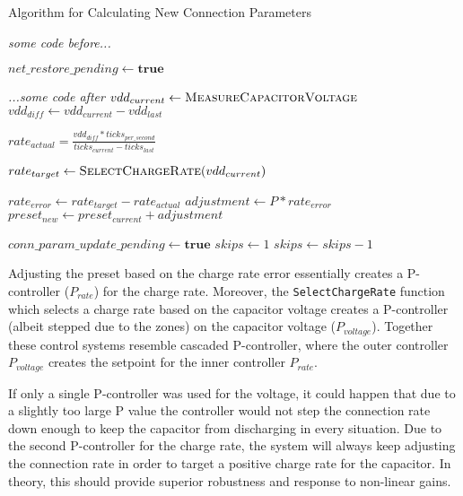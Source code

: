 \begin{algorithm}
    \caption{Algorithm for Calculating New Connection Parameters}
    \label{alg:conn_params_control_system}
    \begin{algorithmic}[1] 
            \State \textit{some code before...}

                \State {}
            \Else
                    \State $net\_restore\_pending \gets \textbf{true}$
                \Else
                    \State {}
                \EndIf
            \EndIf

            \State \textit{...some code after}
        \EndProcedure
            \State $vdd_{current} \gets \Call{MeasureCapacitorVoltage}{}$
            \State $vdd_{diff} \gets vdd_{current} - vdd_{last}$

                    \State $rate_{actual} = \frac{vdd_{diff} * ticks_{per\_second}}{ticks_{current} - ticks_{last}}$

                    \State $rate_{target} \gets \Call{SelectChargeRate}{vdd_{current}}$

                    \State $rate_{error} \gets rate_{target} - rate_{actual}$ 
                    \State $adjustment \gets P * rate_{error}$
                    \State $preset_{new} \gets preset_{current} + adjustment$

                        \State $conn\_param\_update\_pending \gets \textbf{true}$
                        \State $skips \gets 1$
                    \EndIf
                \Else
                    \State $skips \gets skips - 1$
                \EndIf
            \EndIf
        \EndProcedure
    \end{algorithmic}
\end{algorithm}

Adjusting the preset based on the charge rate error essentially creates a P-controller ($P_{rate}$) for the charge rate. Moreover, the \texttt{SelectChargeRate} function which selects a charge rate based on the capacitor voltage creates a P-controller (albeit stepped due to the zones) on the capacitor voltage ($P_{voltage}$). Together these control systems resemble cascaded P-controller, where the outer controller $P_{voltage}$ creates the setpoint for the inner controller $P_{rate}$. 

If only a single P-controller was used for the voltage, it could happen that due to a slightly too large P value the controller would not step the connection rate down enough to keep the capacitor from discharging in every situation. Due to the second P-controller for the charge rate, the system will always keep adjusting the connection rate in order to target a positive charge rate for the capacitor. In theory, this should provide superior robustness and response to non-linear gains.